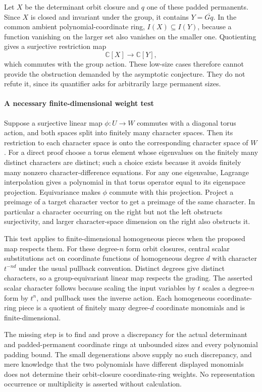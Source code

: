 \documentclass[11pt]{article}
\begin{document}
Let $X$ be the determinant orbit closure and $q$ one of these padded permanents. Since $X$ is closed and invariant under the group, it contains $Y=\overline{Gq}$. In the common ambient polynomial-coordinate ring, $I(X)\subseteq I(Y)$, because a function vanishing on the larger set also vanishes on the smaller one. Quotienting gives a surjective restriction map
\[
 \mathbb C[X]\longrightarrow\mathbb C[Y],
\]
which commutes with the group action. These low-size cases therefore cannot provide the obstruction demanded by the asymptotic conjecture. They do not refute it, since its quantifier asks for arbitrarily large permanent sizes.

\paragraph{A necessary finite-dimensional weight test}
Suppose a surjective linear map $\phi:U\to W$ commutes with a diagonal torus action, and both spaces split into finitely many character spaces. Then its restriction to each character space is onto the corresponding character space of $W$. For a direct proof choose a torus element whose eigenvalues on the finitely many distinct characters are distinct; such a choice exists because it avoids finitely many nonzero character-difference equations. For any one eigenvalue, Lagrange interpolation gives a polynomial in that torus operator equal to its eigenspace projection. Equivariance makes $\phi$ commute with this projection. Project a preimage of a target character vector to get a preimage of the same character. In particular a character occurring on the right but not the left obstructs surjectivity, and larger character-space dimension on the right also obstructs it.

This test applies to finite-dimensional homogeneous pieces when the proposed map respects them. For these degree-$n$ form orbit closures, central scalar substitutions act on coordinate functions of homogeneous degree $d$ with character $t^{-nd}$ under the usual pullback convention. Distinct degrees give distinct characters, so a group-equivariant linear map respects the grading. The asserted scalar character follows because scaling the input variables by $t$ scales a degree-$n$ form by $t^n$, and pullback uses the inverse action. Each homogeneous coordinate-ring piece is a quotient of finitely many degree-$d$ coordinate monomials and is finite-dimensional.

The missing step is to find and prove a discrepancy for the actual determinant and padded-permanent coordinate rings at unbounded sizes and every polynomial padding bound. The small degenerations above supply no such discrepancy, and mere knowledge that the two polynomials have different displayed monomials does not determine their orbit-closure coordinate-ring weights. No representation occurrence or multiplicity is asserted without calculation.
\end{document}
